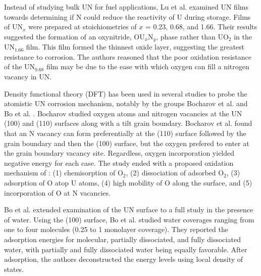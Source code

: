 \documentclass[11pt]{article}
\begin{document}
\begin{multicols}{2}
 Instead of studying bulk UN for fuel applications, Lu et al. \cite{Lu2016} examined UN films towards determining if N could reduce the reactivity of U during storage.  Films of UN$_{x}$ were prepared at stoichiometries of $x$ = 0.23, 0.68, and 1.66. Their results suggested the formation of an oxynitride, OU$_{x}$N$_{y}$, phase rather than UO$_{2}$ in the UN$_{1.66}$ film. This film formed the thinnest oxide layer, suggesting the greatest resistance to corrosion. The authors reasoned that the poor oxidation resistance of the UN$_{0.68}$ film may be due to the ease with which oxygen can fill a nitrogen vacancy in UN.
\par 
Density functional theory (DFT) has been used in several studies to probe the atomistic UN corrosion mechanism, notably by the groups Bocharov et al. \cite{Bocharov2013} and Bo et al. \cite{Bo2016}. Bocharov studied oxygen atoms and nitrogen vacancies at the UN (100) and (110) surfaces along with a tilt grain boundary. Bocharov et al. found that an N vacancy can form preferentially at the (110) surface followed by the grain boundary and then the (100) surface, but the oxygen prefered to enter at the grain boundary vacancy site. Regardless, oxygen incorporation yielded negative energy for each case. The study ended with a proposed oxidation mechanism of \cite{Bocharov2013}: 
	(1) chemisorption of O$_{2}$,
	(2) dissociation of adsorbed O$_{2}$,
	(3) adsorption of O atop U atoms,
	(4) high mobility of O along the surface, and
	(5) incorporation of O at N vacancies.
\par 
Bo et al. \cite{Bo2016} extended examination of the UN surface to a full study in the presence of water. Using the (100) surface, Bo et al. studied water coverages ranging from one to four molecules (0.25 to 1 monolayer coverage). They reported the adsorption energies for molecular, partially dissociated, and fully dissociated water, with partially and fully dissociated water being equally favorable. After adsorption, the authors deconstructed the energy levels using local density of states. 
\begin{table*}[!t]
	
	\setlength{\extrarowheight}{1.5mm}
	\begin{tabular}{ p{3.5cm} p{5cm} p{2.5cm} p{2.5cm}  }
		

\end{tabular}
\end{table*}
\end{multicols}
\end{document}
